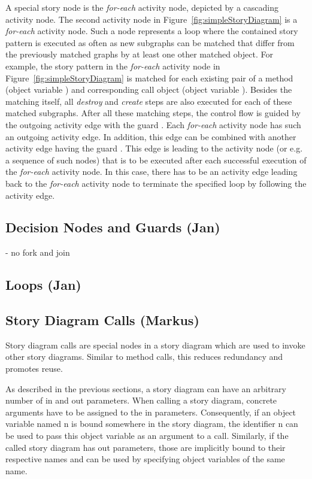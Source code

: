 A special story node is the \emph{for-each} activity node, depicted by a cascading activity node.
The second activity node in Figure~\ref{fig:simpleStoryDiagram} is a \emph{for-each} activity node.
Such a node represents a loop where the contained story pattern is executed as often as new subgraphs can be matched
that differ from the previously matched graphs by at least one other matched object.
For example, the story pattern in the \emph{for-each} activity node in Figure~\ref{fig:simpleStoryDiagram}
is matched for each existing pair of a method (object variable ) and corresponding call object (object variable ).
Besides the matching itself, all \emph{destroy} and \emph{create} steps are also executed for each of these matched subgraphs.
After all these matching steps, the control flow is guided by the outgoing activity edge with the guard .
Each \emph{for-each} activity node has such an outgoing activity edge.
In addition, this edge can be combined with another activity edge having the guard .
This edge is leading to the activity node (or e.g. a sequence of such nodes)
that is to be executed after each successful execution of the \emph{for-each} activity node.
In this case, there has to be an activity edge leading back to the \emph{for-each} activity node
to terminate the specified loop by following the  activity edge.



\subsection{Decision Nodes and Guards (Jan)}
- no fork and join

\subsection{Loops (Jan)}

\subsection{Story Diagram Calls (Markus)}

Story diagram calls are special nodes in a story diagram which are used to invoke other story diagrams. Similar to method calls, this reduces redundancy and promotes reuse.

As described in the previous sections, a story diagram can have an arbitrary number of in and out parameters. When calling a story diagram, concrete arguments have to be assigned to the in parameters. Consequently, if an object variable named n is bound somewhere in the story diagram, the identifier n can be used to pass this object variable as an argument to a call. Similarly, if the called story diagram has out parameters, those are implicitly bound to their respective names and can be used by specifying object variables of the same name.

